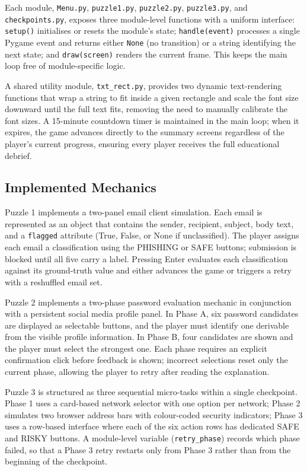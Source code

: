 \documentclass[sigconf, authorversion=true, nonacm=true]{acmart}%
\begin{document}
Each module, \texttt{Menu.py}, \texttt{puzzle1.py}, \texttt{puzzle2.py}, \texttt{puzzle3.py}, and \texttt{checkpoints.py}, exposes three module-level functions with a uniform interface: \texttt{setup()} initialises or resets the module's state; \texttt{handle(event)} processes a single Pygame event and returns either \texttt{None} (no transition) or a string identifying the next state; and \texttt{draw(screen)} renders the current frame. This keeps the main loop free of module-specific logic.

A shared utility module, \texttt{txt\_rect.py}, provides two dynamic text-rendering functions that wrap a string to fit inside a given rectangle and scale the font size downward until the full text fits, removing the need to manually calibrate the font sizes. A 15-minute countdown timer is maintained in the main loop; when it expires, the game advances directly to the summary screens regardless of the player's current progress, ensuring every player receives the full educational debrief.

\subsection{Implemented Mechanics}

Puzzle 1 implements a two-panel email client simulation. Each email is represented as an object that contains the sender, recipient, subject, body text, and a \texttt{flagged} attribute (True, False, or None if unclassified). The player assigns each email a classification using the PHISHING or SAFE buttons; submission is blocked until all five carry a label. Pressing Enter evaluates each classification against its ground-truth value and either advances the game or triggers a retry with a reshuffled email set.

Puzzle 2 implements a two-phase password evaluation mechanic in conjunction with a persistent social media profile panel. In Phase A, six password candidates are displayed as selectable buttons, and the player must identify one derivable from the visible profile information. In Phase B, four candidates are shown and the player must select the strongest one. Each phase requires an explicit confirmation click before feedback is shown; incorrect selections reset only the current phase, allowing the player to retry after reading the explanation.

Puzzle 3 is structured as three sequential micro-tasks within a single checkpoint. Phase 1 uses a card-based network selector with one option per network; Phase 2 simulates two browser address bars with colour-coded security indicators; Phase 3 uses a row-based interface where each of the six action rows has dedicated SAFE and RISKY buttons. A module-level variable (\texttt{retry\_phase}) records which phase failed, so that a Phase 3 retry restarts only from Phase 3 rather than from the beginning of the checkpoint.
\end{document}
